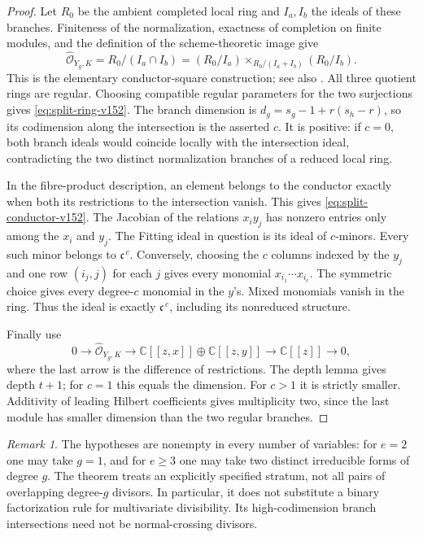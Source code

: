 \documentclass[11pt,reqno]{amsart}
\numberwithin{equation}{section}
\theoremstyle{definition}\newtheorem{definition}[theorem]{Definition}
\theoremstyle{remark}\newtheorem{remark}[theorem]{Remark}
\newcommand{\C}{\mathbb C}\newcommand{\Q}{\mathbb Q}
\newcommand{\OO}{\mathcal O}\newcommand{\II}{\mathcal I}
\begin{document}
\begin{proof}
Let $R_0$ be the ambient completed local ring and $I_a,I_b$ the
ideals of these branches.  Finiteness of the normalization, exactness
of completion on finite modules, and the definition of the
scheme-theoretic image give
\[
 \widehat{\OO}_{Y_g,K}=R_0/(I_a\cap I_b)
   = (R_0/I_a)\mathbin{\times}_{R_0/(I_a+I_b)}(R_0/I_b).
\]
This is the elementary conductor-square construction; see also
\cite[Lemma~1.3 and \S1.3.2]{Ferrand2003}.  All three quotient rings
are regular.  Choosing compatible regular parameters for the two
surjections gives \eqref{eq:split-ring-v152}.  The branch dimension
is $d_g=s_g-1+r(s_h-r)$, so its codimension along the intersection
is the asserted $c$.  It is positive: if $c=0$, both branch ideals
would coincide locally with the intersection ideal, contradicting
the two distinct normalization branches of a reduced local ring.

In the fibre-product description, an element belongs to the
conductor exactly when both its restrictions to the intersection
vanish.  This gives \eqref{eq:split-conductor-v152}.  The Jacobian
of the relations $x_i y_j$ has nonzero entries only among the $x_i$
and $y_j$.  The Fitting ideal in question is its ideal of $c$-minors.
Every such minor belongs to $\mathfrak c^{\,c}$.  Conversely,
choosing the $c$ columns indexed by the $y_j$ and one row $(i_j,j)$
for each $j$ gives every monomial $x_{i_1}\cdots x_{i_c}$.
The symmetric choice gives every degree-$c$ monomial in the $y$'s.
Mixed monomials vanish in the ring.  Thus the ideal is exactly
$\mathfrak c^{\,c}$, including its nonreduced structure.

Finally use
\[
 0\longrightarrow \widehat{\OO}_{Y_g,K}
 \longrightarrow\C[[z,x]]\oplus\C[[z,y]]
 \longrightarrow\C[[z]]\longrightarrow0,
\]
where the last arrow is the difference of restrictions.  The depth
lemma gives depth $t+1$; for $c=1$ this equals the dimension.
For $c>1$ it is strictly smaller.  Additivity of leading Hilbert
coefficients gives multiplicity two, since the last module has
smaller dimension than the two regular branches.
\end{proof}

\begin{remark}\label{rem:split-scope-v152}
The hypotheses are nonempty in every number of variables: for $e=2$
one may take $g=1$, and for $e\geq3$ one may take two distinct
irreducible forms of degree $g$.  The theorem treats an explicitly
specified stratum, not all pairs of overlapping degree-$g$ divisors.
In particular, it does not substitute a binary factorization rule
for multivariate divisibility.  Its high-codimension branch
intersections need not be normal-crossing divisors.
\end{remark}
\end{document}
